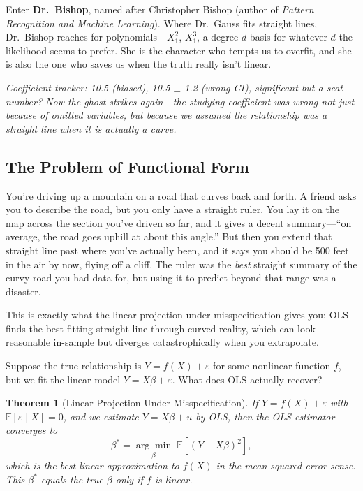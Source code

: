 \documentclass[11pt,a4paper]{article}
\theoremstyle{definition}
\theoremstyle{plain}
\newtheorem{theorem}{Theorem}[section]
\theoremstyle{remark}
\newcommand{\E}{\mathbb{E}}
\begin{document}
\smallskip

\noindent Enter \textbf{Dr.\ Bishop}, named after Christopher Bishop (author of \emph{Pattern Recognition and Machine Learning}). Where Dr.\ Gauss fits straight lines, Dr.\ Bishop reaches for polynomials---$X_1^2$, $X_1^3$, a degree-$d$ basis for whatever $d$ the likelihood seems to prefer. She is the character who tempts us to overfit, and she is also the one who saves us when the truth really isn't linear.

\noindent\textit{Coefficient tracker: 10.5 (biased), 10.5 $\pm$ 1.2 (wrong CI), significant but a seat number? Now the ghost strikes again---the studying coefficient was wrong not just because of omitted variables, but because we assumed the relationship was a straight line when it is actually a curve.}

\subsection{The Problem of Functional Form}

\begin{toystory}[title={The Straight Ruler on a Winding Road}]
You're driving up a mountain on a road that curves back and forth. A friend asks you to describe the road, but you only have a straight ruler. You lay it on the map across the section you've driven so far, and it gives a decent summary---``on average, the road goes uphill at about this angle.'' But then you extend that straight line past where you've actually been, and it says you should be 500 feet in the air by now, flying off a cliff. The ruler was the \emph{best} straight summary of the curvy road you had data for, but using it to predict beyond that range was a disaster.

This is exactly what the linear projection under misspecification gives you: OLS finds the best-fitting straight line through curved reality, which can look reasonable in-sample but diverges catastrophically when you extrapolate.
\end{toystory}

Suppose the true relationship is $Y = f(X) + \varepsilon$ for some nonlinear function $f$, but we fit the linear model $Y = X\beta + \varepsilon$. What does OLS actually recover?

\begin{theorem}[Linear Projection Under Misspecification]\label{thm:linproj}
If $Y = f(X) + \varepsilon$ with $\E[\varepsilon \mid X] = 0$, and we estimate $Y = X\beta + u$ by OLS, then the OLS estimator converges to
\[
  \beta^* = \underset{\beta}{\arg\min}\; \E\!\left[(Y - X\beta)^2\right],
\]
which is the best linear approximation to $f(X)$ in the mean-squared-error sense.
This $\beta^*$ equals the true $\beta$ only if $f$ is linear.
\end{theorem}
\end{document}
